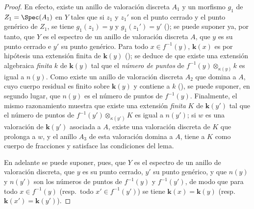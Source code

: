 \begin{proof}
En efecto, existe un anillo de valoración discreta $A_1$ y un morfismo $g_1$ de $Z_1=\Spec(A_1)$ en $Y$ tales que si $z_1$ y $z_1'$ son el punto cerrado y el punto genérico de $Z_1$, se tiene $g_1(z_1)=y$ y $g_1(z_1')=y'$ (); se puede suponer ya, por tanto, que $Y$ es el espectro de un anillo de valoración discreta $A$, que $y$ es su punto cerrado e $y'$ su punto genérico.
Para todo $x\in f^{-1}(y)$, $\boldsymbol{k}(x)$ es por hipótesis una extensión finita de $\boldsymbol{k}(y)$ (); se deduce de  que existe una extensión algebraica \emph{finita} $k$ de $\boldsymbol{k}(y)$ tal que el \emph{número de puntos} de $f^{-1}(y)\otimes_{\kappa(y)}k$ es igual a $n(y)$.
Como existe un anillo de valoración discreta $A_2$ que domina a $A$, cuyo cuerpo residual es finito sobre $\boldsymbol{k}(y)$ y contiene a $k$ (), se puede suponer, en segundo lugar, que $n(y)$ es el número de puntos de $f^{-1}(y)$.
Finalmente, el mismo razonamiento muestra que existe una extensión \emph{finita} $K$ de $\boldsymbol{k}(y')$ tal que el número de puntos de $f^{-1}(y')\otimes_{\kappa(y')}K$ es igual a $n(y')$; si $w$ es una valoración de $\boldsymbol{k}(y')$ asociada a $A$, existe una valoración discreta de $K$ que prolonga a $w$, y el anillo $A_3$ de esta valoración domina a $A$, tiene a $K$ como cuerpo de fracciones y satisface las condiciones del lema.

En adelante se puede suponer, pues, que $Y$ es el espectro de un anillo de valoración discreta, que $y$ es su punto cerrado, $y'$ su punto genérico, y que $n(y)$ y $n(y')$ son los números de puntos de $f^{-1}(y)$ y $f^{-1}(y')$, de modo que para todo $x\in f^{-1}(y)$ (resp.\ todo $x'\in f^{-1}(y')$) se tiene $\boldsymbol{k}(x)=\boldsymbol{k}(y)$ (resp.\ $\boldsymbol{k}(x')=\boldsymbol{k}(y')$).


\end{proof}
